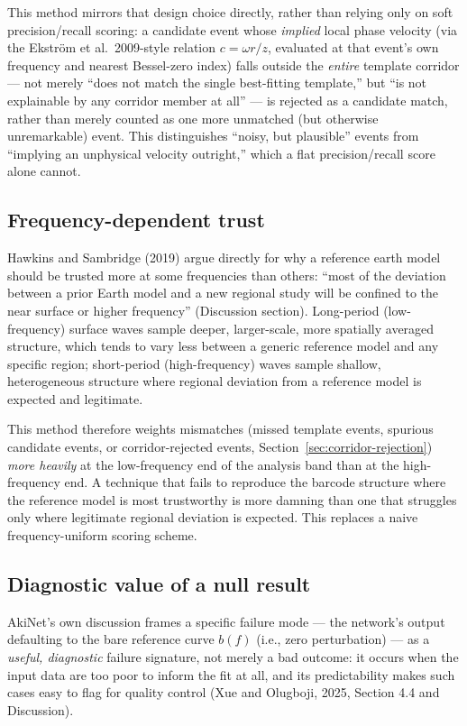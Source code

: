 \documentclass[11pt]{article}
\begin{document}
This method mirrors that design choice directly, rather than relying only on soft
precision/recall scoring: a candidate event whose \emph{implied} local phase velocity (via the
Ekstr\"om et al.\ 2009-style relation $c = \omega r / z$, evaluated at that event's own frequency
and nearest Bessel-zero index) falls outside the \emph{entire} template corridor --- not merely
``does not match the single best-fitting template,'' but ``is not explainable by any corridor
member at all'' --- is rejected as a candidate match, rather than merely counted as one more
unmatched (but otherwise unremarkable) event. This distinguishes ``noisy, but plausible'' events
from ``implying an unphysical velocity outright,'' which a flat precision/recall score alone
cannot.

\subsection{Frequency-dependent trust}
\label{sec:freq-weighting}

Hawkins and Sambridge (2019) argue directly for why a reference earth model should be trusted
more at some frequencies than others: ``most of the deviation between a prior Earth model and a
new regional study will be confined to the near surface or higher frequency'' (Discussion
section). Long-period (low-frequency) surface waves sample deeper, larger-scale, more spatially
averaged structure, which tends to vary less between a generic reference model and any specific
region; short-period (high-frequency) waves sample shallow, heterogeneous structure where
regional deviation from a reference model is expected and legitimate.

This method therefore weights mismatches (missed template events, spurious candidate events, or
corridor-rejected events, Section~\ref{sec:corridor-rejection}) \emph{more heavily} at the
low-frequency end of the analysis band than at the high-frequency end. A technique that fails to
reproduce the barcode structure where the reference model is most trustworthy is more damning
than one that struggles only where legitimate regional deviation is expected. This replaces a
naive frequency-uniform scoring scheme.

\subsection{Diagnostic value of a null result}

AkiNet's own discussion frames a specific failure mode --- the network's output defaulting to the
bare reference curve $b(f)$ (i.e., zero perturbation) --- as a \emph{useful, diagnostic} failure
signature, not merely a bad outcome: it occurs when the input data are too poor to inform the fit
at all, and its predictability makes such cases easy to flag for quality control (Xue and
Olugboji, 2025, Section 4.4 and Discussion).
\end{document}

